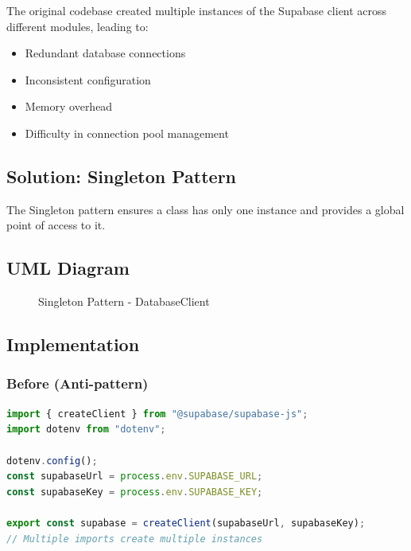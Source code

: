\documentclass[12pt,a4paper]{article}
\begin{document}
The original codebase created multiple instances of the Supabase client across different modules, leading to:
\begin{itemize}
    \item Redundant database connections
    \item Inconsistent configuration
    \item Memory overhead
    \item Difficulty in connection pool management
\end{itemize}

\subsection{Solution: Singleton Pattern}

The Singleton pattern ensures a class has only one instance and provides a global point of access to it.

\subsection{UML Diagram}

\begin{figure}[H]
\centering
{}
\caption{Singleton Pattern - DatabaseClient}
\end{figure}

\subsection{Implementation}

\subsubsection{Before (Anti-pattern)}
\begin{lstlisting}[language=JavaScript, caption=Original supabaseClient.js]
import { createClient } from "@supabase/supabase-js";
import dotenv from "dotenv";

dotenv.config();
const supabaseUrl = process.env.SUPABASE_URL;
const supabaseKey = process.env.SUPABASE_KEY;

export const supabase = createClient(supabaseUrl, supabaseKey);
// Multiple imports create multiple instances
\end{lstlisting}
\end{document}
